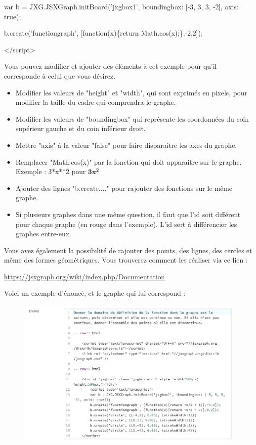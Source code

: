 \documentclass{article}
\begin{document}
\hspace{2cm}var b = JXG.JSXGraph.initBoard({\color{red}'jxgbox1'}, {boundingbox: [-3, 3, 3, -2], axis: true});

\hspace{2cm}b.create('functiongraph', [function(x)\{return Math.cos(x);\},-2,2]);

\hspace{1cm}</script>
\bigskip

Vous pouvez modifier et ajouter des éléments à cet exemple pour qu'il corresponde à celui que vous désirez.

\begin{itemize}
    \item Modifier les valeurs de "height" et "width", qui sont exprimés en pixels, pour modifier la taille du cadre qui comprendra le graphe.
    \item Modifier les valeurs de "boundingbox" qui représente les coordonnées du coin supérieur gauche et du coin inférieur droit.
    \item Mettre "axis" à la valeur "false" pour faire disparaitre les axes du graphe.
    \item Remplacer "Math.cos(x)" par la fonction qui doit apparaitre sur le graphe. Exemple : 3*x**2 pour $\mathbf{3x^2}$
    \item Ajouter des lignes "b.create...." pour rajouter des fonctions sur le même graphe.
    \item Si plusieurs graphes dans une même question, il faut que l'id soit différent pour chaque graphe (en rouge dans l'exemple). L'id sert à différencier les graphes entre-eux.
\end{itemize}
\bigskip

Vous avez également la possibilité de rajouter des points, des lignes, des cercles et même des formes géométriques. Vous trouverez comment les réaliser via ce lien :
\bigskip

\url{https://jsxgraph.org/wiki/index.php/Documentation}

\bigskip

Voici un exemple d'énoncé, et le graphe qui lui correspond :

\begin{figure}[!htb]
    \centering
    \includegraphics[scale=0.6]{images/fonc.png}
\end{figure}
\end{document}
